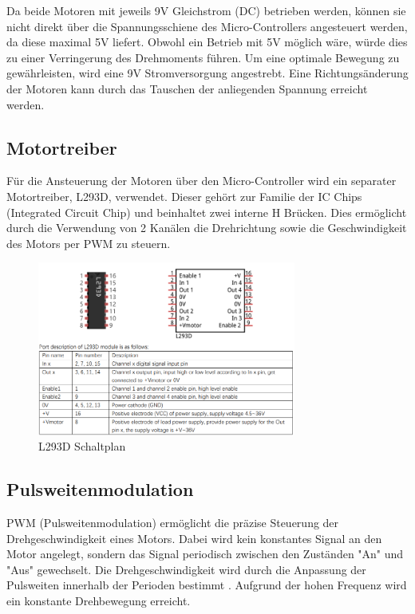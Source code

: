 \documentclass[conference,compsoc,final,a4paper]{IEEEtran}
\begin{document}
\noindent Da beide Motoren mit jeweils 9V Gleichstrom (DC) betrieben werden, können sie nicht direkt über die Spannungsschiene des Micro-Controllers angesteuert werden, 
da diese maximal 5V liefert. Obwohl ein Betrieb mit 5V möglich wäre, würde dies zu einer Verringerung des Drehmoments führen. Um eine optimale Bewegung zu gewährleisten, 
wird eine 9V Stromversorgung angestrebt.  Eine Richtungsänderung der Motoren kann durch das Tauschen der anliegenden Spannung erreicht werden.  

\subsection{Motortreiber}

Für die Ansteuerung der Motoren über den Micro-Controller wird ein separater Motortreiber, L293D, verwendet.
Dieser gehört zur Familie der IC Chips (Integrated Circuit Chip) und beinhaltet zwei interne H Brücken. Dies ermöglicht durch die Verwendung von 2 Kanälen die Drehrichtung 
sowie die Geschwindigkeit des Motors per PWM zu steuern.

\begin{figure}[h]
  \centering
\includegraphics[width=8.5cm]{../images/L293D.png}
\caption{L293D Schaltplan \autocite{freenoveTutorial}}\label{Elektrik:L293D}
\end{figure}

\subsection{Pulsweitenmodulation}
PWM (Pulsweitenmodulation) ermöglicht die präzise Steuerung der Drehgeschwindigkeit eines Motors. Dabei wird kein konstantes Signal an den Motor angelegt,
sondern das Signal periodisch zwischen den Zuständen "An" und "Aus" gewechselt. Die Drehgeschwindigkeit wird durch die Anpassung der Pulsweiten innerhalb der Perioden 
bestimmt \autocite{611797}. Aufgrund der hohen Frequenz wird ein konstante Drehbewegung erreicht. 
\end{document}
